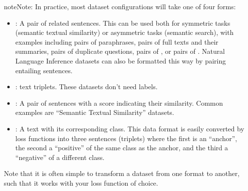 \documentclass[letterpaper,11pt,english]{sphinxmanual}
\begin{document}
\begin{sphinxadmonition}{note}{Note:}
\sphinxAtStartPar
In practice, most dataset configurations will take one of four forms:
\begin{itemize}
\item {} 
\sphinxAtStartPar
{}: A pair of related sentences. This can be used both for symmetric tasks
(semantic textual similarity) or asymmetric tasks (semantic search), with examples
including pairs of paraphrases, pairs of full texts and their summaries, pairs of
duplicate questions, pairs of , or pairs of
.
Natural Language Inference datasets can also be formatted this way by pairing entailing sentences.

\item {} 
\sphinxAtStartPar
{}:  text triplets. These datasets don’t need labels.

\item {} 
\sphinxAtStartPar
{}: A pair of sentences with a score indicating their similarity.
Common examples are “Semantic Textual Similarity” datasets.

\item {} 
\sphinxAtStartPar
{}: A text with its corresponding class. This data format is easily
converted by loss functions into three sentences (triplets) where the first is an “anchor”,
the second a “positive” of the same class as the anchor, and the third a “negative” of a different class.

\end{itemize}

\sphinxAtStartPar
Note that it is often simple to transform a dataset from one format to another, such that it works with
your loss function of choice.
\end{sphinxadmonition}
\end{document}
